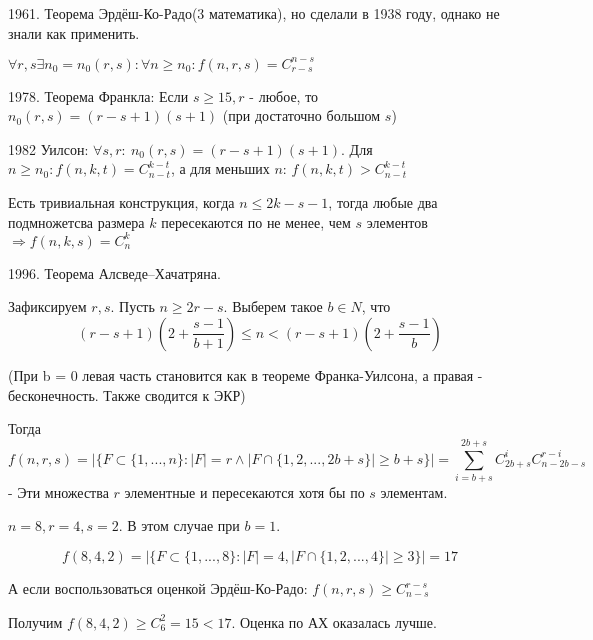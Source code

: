 1961. Теорема Эрдёш-Ко-Радо(3 математика), но сделали в 1938 году, однако не знали как применить.

$\forall r, s \exists n_0 = n_0(r, s): \forall n \geqslant n_0: f(n, r, s) = C_{r-s}^{n-s}$

1978. Теорема Франкла: Если $s \geqslant 15, r$ - любое, то $n_0(r, s) = (r-s+1)(s+1)$ (при достаточно большом $s$)

1982 Уилсон: $\forall s, r:\ n_0(r, s) = (r-s+1)(s+1)$. Для $n \geqslant n_0: f(n, k, t) = C_{n-t}^{k-t}$, а для меньших $n$: $f(n, k, t) > C_{n-t}^{k-t}$

Есть тривиальная конструкция, когда $n \leqslant 2k - s - 1$, тогда любые два подмножетсва размера $k$ пересекаются по не менее, чем $s$ элементов $\Rightarrow f(n, k, s) = C_n^k$

1996. Теорема Алсведе–Хачатряна.

Зафиксируем $r, s$. Пусть $n \geqslant 2r - s$. Выберем такое $b \in N$, что
$$(r-s+1)(2+\frac{s-1}{b+1}) \leqslant n < (r-s+1)(2+\frac{s-1}{b})$$

(При b = 0 левая часть становится как в теореме Франка-Уилсона, а правая - бесконечность. Также сводится к ЭКР)

Тогда 
$$f(n, r, s) = \left| \{F \subset \{1, ..., n\}: |F| = r \wedge |F \cap \{1, 2, ..., 2b + s\}| \geqslant b + s\} \right| = \sum_{i=b+s}^{2b+s} C_{2b+s}^i C_{n - 2b - s}^{r-i}$$ 
- Эти множества $r$ элементные и пересекаются хотя бы по $s$ элементам.

\Example $n = 8, r = 4, s = 2$. В этом случае при $b = 1$.    

$$f(8, 4, 2) = \left| \{F \subset \{1, ..., 8\}: |F| = 4, |F \cap \{1, 2, ..., 4\}| \geqslant 3\} \right| = 17$$ 

А если воспользоваться оценкой Эрдёш-Ко-Радо: $f(n, r, s) \geqslant C_{n - s}^{r - s}$

Получим $f(8, 4, 2) \geqslant C_{6}^{2} = 15 < 17$. Оценка по АХ оказалась лучше.

